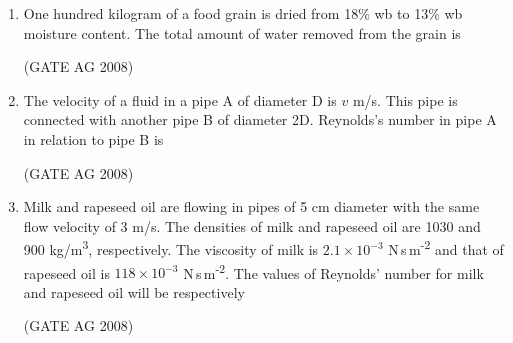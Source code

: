 \documentclass[journal,12pt,onecolumn]{IEEEtran}
\begin{document}
\begin{enumerate}
\medskip

\item 
 One hundred kilogram of a food grain is dried from 18\% wb to 13\% wb moisture content. The total amount of water removed from the grain is
\begin{enumerate}
\end{enumerate}
\hfill(GATE AG 2008)\\

\medskip

\item 
 The velocity of a fluid in a pipe A of diameter D is $v$ m/s. This pipe is connected with another pipe B of diameter 2D. Reynolds's number in pipe A in relation to pipe B is
\begin{enumerate}
\end{enumerate}
\hfill(GATE AG 2008)\\

\medskip

\item 
 Milk and rapeseed oil are flowing in pipes of 5 cm diameter with the same flow velocity of 3 m/s. The densities of milk and rapeseed oil are 1030 and 900 kg/m\textsuperscript{3}, respectively. The viscosity of milk is $2.1 \times 10^{-3}$ N\,s\,m\textsuperscript{-2} and that of rapeseed oil is $118 \times 10^{-3}$ N\,s\,m\textsuperscript{-2}. The values of Reynolds' number for milk and rapeseed oil will be respectively
\begin{enumerate}
\end{enumerate}
\hfill(GATE AG 2008)\\


\end{enumerate}
\end{document}
